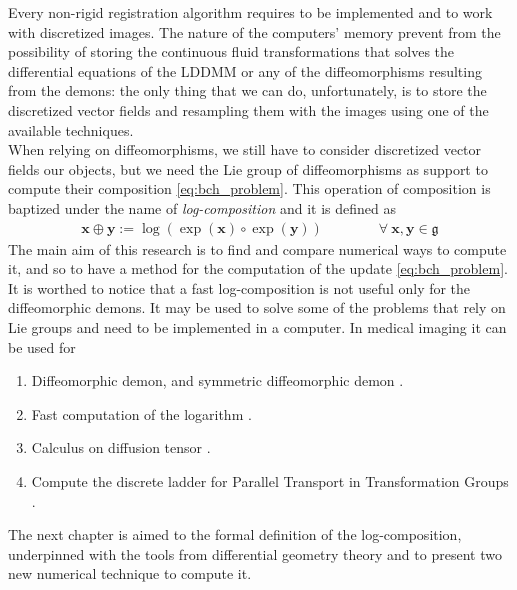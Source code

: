Every non-rigid registration algorithm requires to be implemented and to work with discretized images.
The nature of the computers' memory prevent from the possibility of storing the continuous fluid transformations that solves the differential equations of the LDDMM or any of the diffeomorphisms resulting from the demons: the only thing that we can do, unfortunately, is to store the discretized vector fields and resampling them with the images using one of the available techniques.\\
When relying on diffeomorphisms, we still have to consider discretized vector fields our objects, but we need the Lie group of diffeomorphisms as support to compute their composition \ref{eq:bch_problem}.
This operation of composition is baptized under the name of \emph{log-composition} and it is defined as
\begin{align*}
\mathbf{x} \oplus \mathbf{y} := \log(\exp(\mathbf{x})\circ\exp( \mathbf{y}))
\qquad \qquad
\forall ~\mathbf{x}, \mathbf{y} \in \mathfrak{g}
\end{align*}
The main aim of this research is to find and compare numerical ways to compute it, and so to have a method for the computation of the update \ref{eq:bch_problem}. \\

It is worthed to notice that a fast log-composition is not useful only for the diffeomorphic demons. It may be used to solve some of the problems that rely on Lie groups and need to be implemented in a computer. In medical imaging it can be used for
\begin{enumerate}
	\item Diffeomorphic demon, and symmetric diffeomorphic demon \cite{vercauteren2006robust, vercauteren08}.
	\item Fast computation of the logarithm \cite{Bossa:08}.
	\item Calculus on diffusion tensor \cite{Arsigny:MRM:06}. 
	\item Compute the discrete ladder for Parallel Transport in Transformation Groups \cite{Lorenzi:discrete_ladders:14}.
\end{enumerate}	
	
The next chapter is aimed to the formal definition of the log-composition, underpinned with the tools from differential geometry theory and to present two new numerical technique to compute it.







